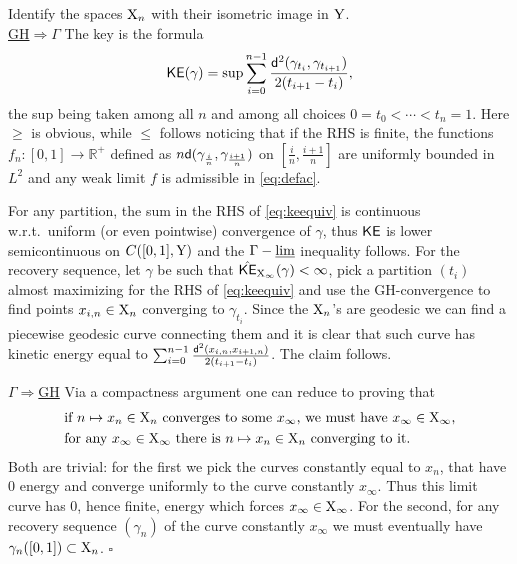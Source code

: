 \documentclass[11pt]{article}
\numberwithin{equation}{section}
\newenvironment{idea}{\removelastskip\par\medskip   %
\noindent{\em Idea of the proof} \rm}{\penalty-20\null\hfill$\square$\par\medbreak}
\newcommand{\R}{\mathbb{R}}
\newcommand{\X}{{\rm X}}
\newcommand{\Y}{{\rm Y}}
\newcommand{\sfd}{{\sf d}}
\newcommand{\limi}{\varliminf}
\DeclareMathOperator*{\glimi}{{\Gamma-\limi}}
\begin{document}
\begin{idea}Identify the spaces $\X_n$ with their isometric image in $\Y$. \ \\
\noindent\underline{GH$\Rightarrow\Gamma$} The key is the formula
\begin{equation}
\label{eq:keequiv}
{\sf KE}(\gamma)=\sup\sum_{i=0}^{n-1}\frac{\sfd^2(\gamma_{t_i},\gamma_{t_{i+1}})}{2(t_{i+1}-t_i)},
\end{equation}
the sup being taken among all $n$ and among all choices $0=t_0<\cdots<t_n=1$. Here $\geq$ is obvious, while $\leq$ follows noticing that if the RHS is finite, the functions $f_n:[0,1]\to\R^+$ defined as $n\sfd(\gamma_{\frac in},\gamma_{\frac {i+1}n})$ on $[\tfrac in,\tfrac{i+1}n]$ are uniformly bounded in $L^2$ and any weak limit $f$ is admissible in \eqref{eq:defac}. 

For any partition, the sum in the RHS of \eqref{eq:keequiv} is continuous w.r.t.\ uniform (or even pointwise) convergence of $\gamma$, thus ${\sf KE}$ is lower semicontinuous on $C([0,1],\Y)$ and the $\glimi$ inequality follows. For the recovery sequence, let $\gamma$ be such that $\hat{\sf KE}_{\X_\infty}(\gamma)<\infty$, pick a partition $(t_i)$ almost maximizing for the RHS of \eqref{eq:keequiv} and use the GH-convergence to find points $x_{i,n}\in \X_n$ converging to $\gamma_{t_i}$. Since the $\X_n$'s are geodesic we can find a piecewise geodesic curve connecting them and it is clear that such curve has kinetic energy equal to $\sum_{i=0}^{n-1}\frac{\sfd^2(x_{i,n},x_{i+1,n})}{2(t_{i+1}-t_i)}$. The claim follows.

\noindent\underline{$\Gamma\Rightarrow$GH} Via a compactness argument one can reduce to proving that
\[
\begin{split}
&\text{if $n\mapsto x_n\in\X_n$ converges to some $x_\infty$, we must have $x_\infty\in\X_\infty$,}\\
&\text{for any $x_\infty\in\X_\infty$ there is $n\mapsto x_n\in\X_n$ converging to it.}
\end{split}
\]
Both are trivial: for the first we pick the curves constantly equal to $x_n$, that have 0 energy and converge uniformly to the curve constantly $x_\infty$. Thus this limit curve has 0, hence finite, energy which forces $x_\infty\in\X_\infty$. For the second, for any recovery sequence $(\gamma_n)$ of the curve constantly $x_\infty$   we must eventually have  $\gamma_n([0,1])\subset\X_n$.
\end{idea}
\end{document}
